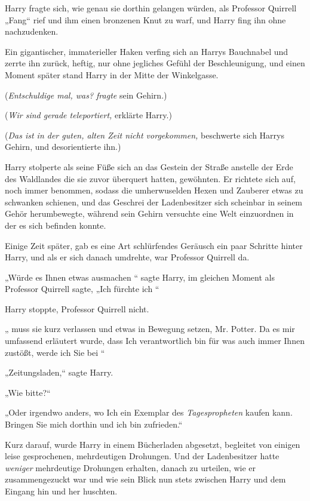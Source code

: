 {Harry fragte sich, wie genau sie dorthin gelangen würden, als Professor Quirrell „Fang“ rief und ihm einen bronzenen Knut zu warf, und Harry fing ihn ohne nachzudenken.

Ein gigantischer, immaterieller Haken verfing sich an Harrys Bauchnabel und zerrte ihn zurück, heftig, nur ohne jegliches Gefühl der Beschleunigung, und einen Moment später stand Harry in der Mitte der Winkelgasse.

(\emph{Entschuldige mal, was? fragte} sein Gehirn.)

(\emph{Wir sind gerade teleportiert,} erklärte Harry.)

(\emph{Das ist in der guten, alten Zeit nicht vorgekommen,} beschwerte sich Harrys Gehirn, und desorientierte ihn.)

Harry stolperte als seine Füße sich an das Gestein der Straße anstelle der Erde des Waldlandes die sie zuvor überquert hatten, gewöhnten. Er richtete sich auf, noch immer benommen, sodass die umherwuselden Hexen und Zauberer etwas zu schwanken schienen, und das Geschrei der Ladenbesitzer sich scheinbar in seinem Gehör herumbewegte, während sein Gehirn versuchte eine Welt einzuordnen in der es sich befinden konnte.

Einige Zeit später, gab es eine Art schlürfendes Geräusch ein paar Schritte hinter Harry, und als er sich danach umdrehte, war Professor Quirrell da.

„Würde es Ihnen etwas ausmachen \later“ sagte Harry, im gleichen Moment als Professor Quirrell sagte, „Ich fürchte ich \later“

Harry stoppte, Professor Quirrell nicht.

„ muss sie kurz verlassen und etwas in Bewegung setzen, Mr. Potter. Da es mir umfassend erläutert wurde, dass Ich verantwortlich bin für was auch immer Ihnen zustößt, werde ich Sie bei \later“

„Zeitungsladen,“ sagte Harry.

„Wie bitte?“

„Oder irgendwo anders, wo Ich ein Exemplar des \emph{Tagespropheten} kaufen kann. Bringen Sie mich dorthin und ich bin zufrieden.“

Kurz darauf, wurde Harry in einem Bücherladen abgesetzt, begleitet von einigen leise gesprochenen, mehrdeutigen Drohungen. Und der Ladenbesitzer hatte \emph{weniger} mehrdeutige Drohungen erhalten, danach zu urteilen, wie er zusammengezuckt war und wie sein Blick nun stets zwischen Harry und dem Eingang hin und her huschten.

}
